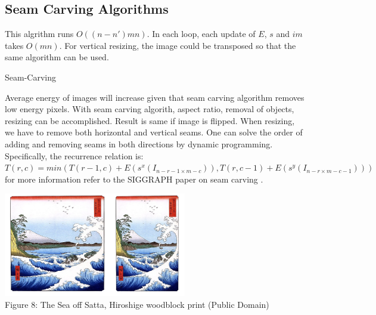 \documentclass{article}
\makeatletter
\def\BState{\State\hskip-\ALG@thistlm}
\makeatother
\begin{document}
\subsection{Seam Carving Algorithms}
This algrithm runs $O((n-n')mn)$. In each loop, each update of $E$, $s$ and $im$ takes $O(mn)$. For vertical resizing, the image could be transposed so that the same algorithm can be used.
\begin{algorithm}
\caption{Seam-Carving}\label{euclid}
\end{algorithm}


Average energy of images will increase given that seam carving algorithm removes low energy pixels. With seam carving algorith, aspect ratio, removal of objects, resizing can be accomplished. Result is same if image is flipped. When resizing, we have to remove both horizontal and vertical seams. One can solve the order of adding and removing seams in both directions by dynamic programming. Specifically, the recurrence relation is: $T(r,c)=min(T(r-1,c)+E(s^x(I_{n-r-1\times m-c})),T(r,c-1)+E(s^y(I_{n-r\times m-c-1})))$ for more information refer to the SIGGRAPH paper on seam carving \cite{siggraphseamcarving}.

\begin{center}
\includegraphics[width=8cm]{content_aware_resizing.png} \\
Figure 8: The Sea off Satta, Hiroshige woodblock print (Public Domain)
\end{center}
\end{document}
